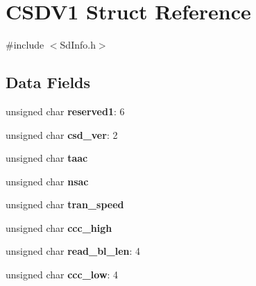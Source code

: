 \hypertarget{struct_c_s_d_v1}{\section{C\-S\-D\-V1 Struct Reference}
\label{struct_c_s_d_v1}
}


{\ttfamily \#include $<$Sd\-Info.\-h$>$}

\subsection*{Data Fields}
\begin{DoxyCompactItemize}
\item 
\hypertarget{struct_c_s_d_v1_affe215a7220b2d52fb9dacf3b35e56dc}{unsigned char {\bfseries reserved1}\-: 6}\label{struct_c_s_d_v1_affe215a7220b2d52fb9dacf3b35e56dc}

\item 
\hypertarget{struct_c_s_d_v1_a468f68d66a14a0e3d70ae9dce7c7b084}{unsigned char {\bfseries csd\-\_\-ver}\-: 2}\label{struct_c_s_d_v1_a468f68d66a14a0e3d70ae9dce7c7b084}

\item 
\hypertarget{struct_c_s_d_v1_add15a5302761bd6e2ee294c0c38e9f8a}{unsigned char {\bfseries taac}}\label{struct_c_s_d_v1_add15a5302761bd6e2ee294c0c38e9f8a}

\item 
\hypertarget{struct_c_s_d_v1_a877524d1f9ede3c07079957826d08a1e}{unsigned char {\bfseries nsac}}\label{struct_c_s_d_v1_a877524d1f9ede3c07079957826d08a1e}

\item 
\hypertarget{struct_c_s_d_v1_af83be4d825b2e325d094297e81693443}{unsigned char {\bfseries tran\-\_\-speed}}\label{struct_c_s_d_v1_af83be4d825b2e325d094297e81693443}

\item 
\hypertarget{struct_c_s_d_v1_a76b00b1b0657aefa115a98f122aca8c5}{unsigned char {\bfseries ccc\-\_\-high}}\label{struct_c_s_d_v1_a76b00b1b0657aefa115a98f122aca8c5}

\item 
\hypertarget{struct_c_s_d_v1_af43ab7cd256a4134cd3b78bdecb9d7c5}{unsigned char {\bfseries read\-\_\-bl\-\_\-len}\-: 4}\label{struct_c_s_d_v1_af43ab7cd256a4134cd3b78bdecb9d7c5}

\item 
\hypertarget{struct_c_s_d_v1_ad38ba451d9647c41a9b60a2f7a61e9d4}{unsigned char {\bfseries ccc\-\_\-low}\-: 4}\label{struct_c_s_d_v1_ad38ba451d9647c41a9b60a2f7a61e9d4}


\end{DoxyCompactItemize}
